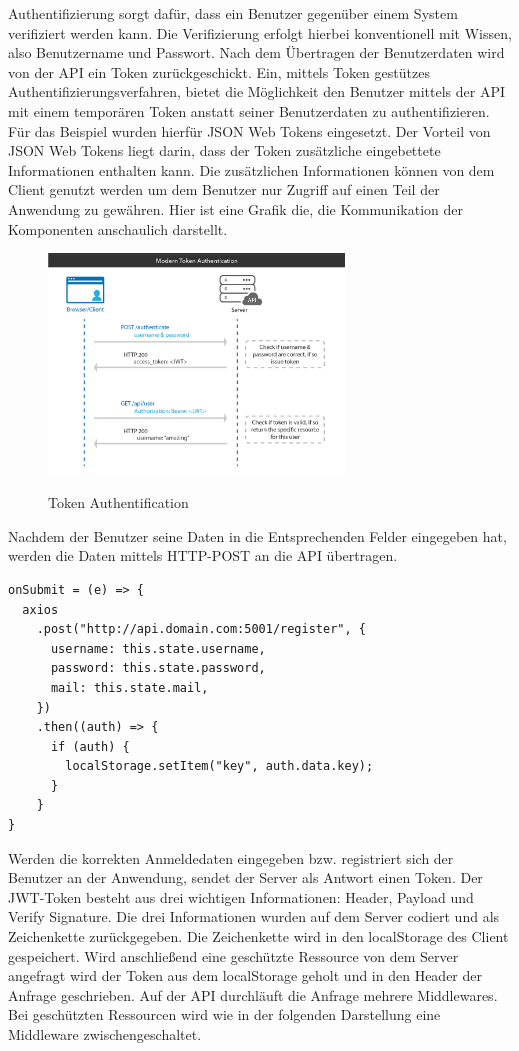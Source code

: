 \documentclass[utf8,biblatex]{lni}
\begin{document}
Authentifizierung sorgt dafür, dass ein Benutzer gegenüber einem System verifiziert werden kann.
Die Verifizierung erfolgt hierbei konventionell mit Wissen, also Benutzername und Passwort.
Nach dem Übertragen der Benutzerdaten wird von der API ein Token zurückgeschickt.
Ein, mittels Token gestützes Authentifizierungsverfahren, bietet die Möglichkeit den Benutzer mittels 
der API mit einem temporären Token anstatt seiner Benutzerdaten zu authentifizieren. 
Für das Beispiel wurden hierfür JSON Web Tokens \cite{JWT} eingesetzt. 
Der Vorteil von JSON Web Tokens liegt darin, dass der Token zusätzliche eingebettete Informationen
enthalten kann. 
Die zusätzlichen Informationen können von dem Client genutzt werden um dem Benutzer 
nur Zugriff auf einen Teil der Anwendung zu gewähren. 
Hier ist eine Grafik die, die Kommunikation der Komponenten anschaulich darstellt.
\newpage
\begin{figure}
  \centering
  \includegraphics[width=0.7\textwidth]{images/token-auth.png}
  \caption[Token Authentification]{Token Authentification} 
  \label{token-auth}
  \cite{OktaJWTAuth}
\end{figure} 

Nachdem der Benutzer seine Daten in die Entsprechenden Felder eingegeben hat, werden die Daten 
mittels HTTP-POST an die API übertragen.

\begin{verbatim}
onSubmit = (e) => {
  axios
    .post("http://api.domain.com:5001/register", {
      username: this.state.username,
      password: this.state.password,
      mail: this.state.mail,
    })
    .then((auth) => {
      if (auth) {
        localStorage.setItem("key", auth.data.key);
      }
    }
}
\end{verbatim}

Werden die korrekten Anmeldedaten eingegeben bzw. registriert sich der Benutzer an der 
Anwendung, sendet der Server als Antwort einen Token. 
Der JWT-Token besteht aus drei wichtigen Informationen: Header, Payload und Verify Signature.
Die drei Informationen wurden auf dem Server codiert und als Zeichenkette zurückgegeben. 
Die Zeichenkette wird in den localStorage des Client gespeichert. Wird anschließend eine 
geschützte Ressource von dem Server angefragt wird der Token aus dem localStorage geholt 
und in den Header der Anfrage geschrieben.
Auf der API durchläuft die Anfrage mehrere Middlewares. 
Bei geschützten Ressourcen wird wie in der folgenden Darstellung eine Middleware 
zwischengeschaltet. 
\end{document}
